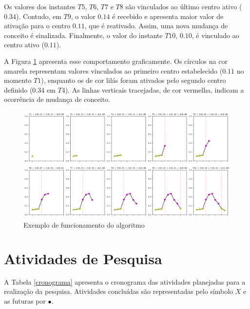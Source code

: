 \documentclass[qual, classic, a4paper]{ufbathesis}
\begin{document}
Os valores dos instantes $T5$, $T6$, $T7$ e $T8$ são vinculados ao último centro ativo ($0.34$). 
Contudo, em $T9$, o valor $0.14$ é recebido e apresenta maior valor de ativação para o centro $0.11$, que é reativado. 
Assim, uma nova mudança de conceito é sinalizada.
Finalmente, o valor do instante $T10$, $0.10$, é vinculado ao centro ativo ($0.11$).

A Figura \ref{fig:funcionamento_algoritmo} apresenta esse comportamento graficamente. 
Os círculos na cor amarela representam valores vinculados ao primeiro centro estabelecido ($0.11$ no momento $T1$), 
enquanto os de cor lilás foram ativados pelo segundo centro definido ($0.34$ em $T4$).
As linhas verticais tracejadas, de cor vermelha, indicam a ocorrência de mudança de conceito.

\begin{figure}[H]
\begin{center}
    \includegraphics[width=\textwidth]{imagens/funcionamento_algoritmo.png}
    \caption{Exemplo de funcionamento do algoritmo}
    \label{fig:funcionamento_algoritmo}
\end{center}
\end{figure}

\section{Atividades de Pesquisa}

A Tabela \ref{cronograma} apresenta o cronograma das atividades planejadas para a realização da pesquisa. Atividades concluídas são representadas pelo símbolo $X$ e as futuras por $\bullet$. 
\end{document}
